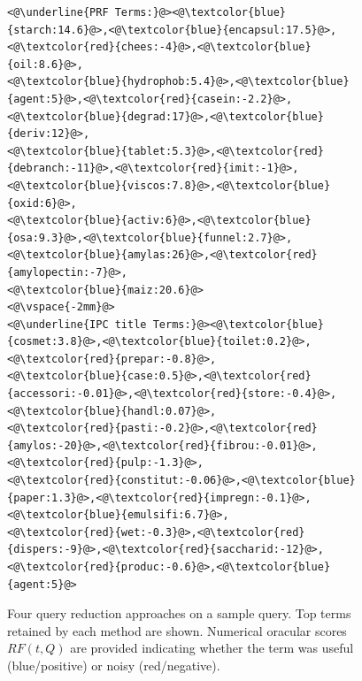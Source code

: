 \begin{figure}[t!]
\begin{framed}
\begin{lstlisting}[basicstyle=\scriptsize\ttfamily , linewidth=\columnwidth,breaklines=true]
<@\underline{PRF Terms:}@><@\textcolor{blue}{starch:14.6}@>,<@\textcolor{blue}{encapsul:17.5}@>,<@\textcolor{red}{chees:-4}@>,<@\textcolor{blue}{oil:8.6}@>,
<@\textcolor{blue}{hydrophob:5.4}@>,<@\textcolor{blue}{agent:5}@>,<@\textcolor{red}{casein:-2.2}@>,<@\textcolor{blue}{degrad:17}@>,<@\textcolor{blue}{deriv:12}@>,
<@\textcolor{blue}{tablet:5.3}@>,<@\textcolor{red}{debranch:-11}@>,<@\textcolor{red}{imit:-1}@>,<@\textcolor{blue}{viscos:7.8}@>,<@\textcolor{blue}{oxid:6}@>,
<@\textcolor{blue}{activ:6}@>,<@\textcolor{blue}{osa:9.3}@>,<@\textcolor{blue}{funnel:2.7}@>,<@\textcolor{blue}{amylas:26}@>,<@\textcolor{red}{amylopectin:-7}@>,
<@\textcolor{blue}{maiz:20.6}@>
<@\vspace{-2mm}@>
<@\underline{IPC title Terms:}@><@\textcolor{blue}{cosmet:3.8}@>,<@\textcolor{blue}{toilet:0.2}@>,<@\textcolor{red}{prepar:-0.8}@>,
<@\textcolor{blue}{case:0.5}@>,<@\textcolor{red}{accessori:-0.01}@>,<@\textcolor{red}{store:-0.4}@>,<@\textcolor{blue}{handl:0.07}@>,
<@\textcolor{red}{pasti:-0.2}@>,<@\textcolor{red}{amylos:-20}@>,<@\textcolor{red}{fibrou:-0.01}@>,<@\textcolor{red}{pulp:-1.3}@>,
<@\textcolor{red}{constitut:-0.06}@>,<@\textcolor{blue}{paper:1.3}@>,<@\textcolor{red}{impregn:-0.1}@>,<@\textcolor{blue}{emulsifi:6.7}@>,
<@\textcolor{red}{wet:-0.3}@>,<@\textcolor{red}{dispers:-9}@>,<@\textcolor{red}{saccharid:-12}@>,<@\textcolor{red}{produc:-0.6}@>,<@\textcolor{blue}{agent:5}@>
 \end{lstlisting} 
 \vspace*{-3ex}
\end{framed}
 \vspace*{-3.5ex}
  \caption{Four query reduction approaches on a sample query.  Top
    terms retained by each method are shown.  Numerical oracular
    scores $\mathit{RF}(t,Q)$ are provided indicating whether the term
    was useful (blue/positive) or noisy (red/negative).}
  \label{fig:anecdotal}  
\end{figure}

